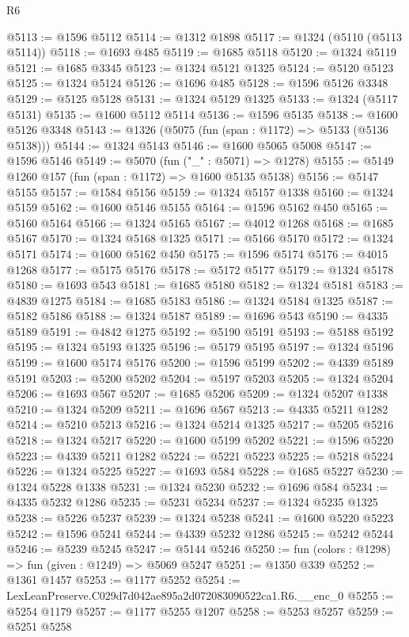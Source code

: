 \begin{lexlean}{R6}
\begin{coremodule}
@5113 := @1596 @5112
@5114 := @1312 @1898
@5117 := @1324 (@5110 (@5113 @5114))
@5118 := @1693 @485
@5119 := @1685 @5118
@5120 := @1324 @5119
@5121 := @1685 @3345
@5123 := @1324 @5121 @1325
@5124 := @5120 @5123
@5125 := @1324 @5124
@5126 := @1696 @485
@5128 := @1596 @5126 @3348
@5129 := @5125 @5128
@5131 := @1324 @5129 @1325
@5133 := @1324 (@5117 @5131)
@5135 := @1600 @5112 @5114
@5136 := @1596 @5135
@5138 := @1600 @5126 @3348
@5143 := @1326 (@5075 (fun (span : @1172) => @5133 (@5136 @5138)))
@5144 := @1324 @5143
@5146 := @1600 @5065 @5008
@5147 := @1596 @5146
@5149 := @5070 (fun ("_" : @5071) => @1278)
@5155 := @5149 @1260 @157 (fun (span : @1172) => @1600 @5135 @5138)
@5156 := @5147 @5155
@5157 := @1584 @5156
@5159 := @1324 @5157 @1338
@5160 := @1324 @5159
@5162 := @1600 @5146 @5155
@5164 := @1596 @5162 @450
@5165 := @5160 @5164
@5166 := @1324 @5165
@5167 := @4012 @1268
@5168 := @1685 @5167
@5170 := @1324 @5168 @1325
@5171 := @5166 @5170
@5172 := @1324 @5171
@5174 := @1600 @5162 @450
@5175 := @1596 @5174
@5176 := @4015 @1268
@5177 := @5175 @5176
@5178 := @5172 @5177
@5179 := @1324 @5178
@5180 := @1693 @543
@5181 := @1685 @5180
@5182 := @1324 @5181
@5183 := @4839 @1275
@5184 := @1685 @5183
@5186 := @1324 @5184 @1325
@5187 := @5182 @5186
@5188 := @1324 @5187
@5189 := @1696 @543
@5190 := @4335 @5189
@5191 := @4842 @1275
@5192 := @5190 @5191
@5193 := @5188 @5192
@5195 := @1324 @5193 @1325
@5196 := @5179 @5195
@5197 := @1324 @5196
@5199 := @1600 @5174 @5176
@5200 := @1596 @5199
@5202 := @4339 @5189 @5191
@5203 := @5200 @5202
@5204 := @5197 @5203
@5205 := @1324 @5204
@5206 := @1693 @567
@5207 := @1685 @5206
@5209 := @1324 @5207 @1338
@5210 := @1324 @5209
@5211 := @1696 @567
@5213 := @4335 @5211 @1282
@5214 := @5210 @5213
@5216 := @1324 @5214 @1325
@5217 := @5205 @5216
@5218 := @1324 @5217
@5220 := @1600 @5199 @5202
@5221 := @1596 @5220
@5223 := @4339 @5211 @1282
@5224 := @5221 @5223
@5225 := @5218 @5224
@5226 := @1324 @5225
@5227 := @1693 @584
@5228 := @1685 @5227
@5230 := @1324 @5228 @1338
@5231 := @1324 @5230
@5232 := @1696 @584
@5234 := @4335 @5232 @1286
@5235 := @5231 @5234
@5237 := @1324 @5235 @1325
@5238 := @5226 @5237
@5239 := @1324 @5238
@5241 := @1600 @5220 @5223
@5242 := @1596 @5241
@5244 := @4339 @5232 @1286
@5245 := @5242 @5244
@5246 := @5239 @5245
@5247 := @5144 @5246
@5250 := fun (colors : @1298) => fun (given : @1249) => @5069 @5247
@5251 := @1350 @339
@5252 := @1361 @1457
@5253 := @1177 @5252
@5254 := LexLeanPreserve.C029d7d042ae895a2d072083090522ca1.R6.__enc_0
@5255 := @5254 @1179
@5257 := @1177 @5255 @1207
@5258 := @5253 @5257
@5259 := @5251 @5258

\end{coremodule}
\end{lexlean}
